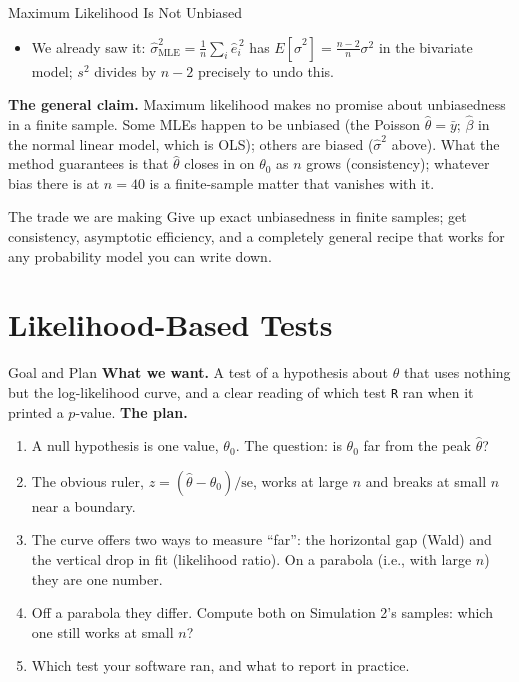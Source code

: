 \documentclass[aspectratio=169,11pt,xcolor=dvipsnames]{beamer}
\newcommand{\E}{E}
\newcommand{\SE}{\mathrm{se}}
\newcommand{\core}{\,\raisebox{0.6pt}{\textcolor{corestar}{$\bigstar$}}}
\begin{document}
\begin{frame}{Maximum Likelihood Is Not Unbiased\core}
\begin{itemize}\itemsep4pt
  \item We already saw it: $\hat\sigma^2_{\text{MLE}} = \frac1n\sum_i \hat e_i^{\,2}$
        has $\E[\hat\sigma^2] = \frac{n-2}{n}\sigma^2$ in the bivariate
        model; $s^2$ divides by $n-2$ precisely to undo this.
\end{itemize}
\vskip6pt
\textbf{The general claim.} Maximum likelihood makes no promise about
unbiasedness in a finite sample. Some MLEs happen to be unbiased (the Poisson
$\hat\theta = \bar y$; $\hat\beta$ in the normal linear model, which is OLS);
others are biased ($\hat\sigma^2$ above). What the method guarantees is that
$\hat\theta$ closes in on $\theta_0$ as $n$ grows (consistency); whatever
bias there is at $n = 40$ is a finite-sample matter that vanishes with it.
\vskip8pt
\begin{alertblock}{The trade we are making}
Give up exact unbiasedness in finite samples; get consistency, asymptotic
efficiency, and a completely general recipe that works for any probability model
you can write down.
\end{alertblock}
\end{frame}

\section[Testing]{Likelihood-Based Tests}


\begin{frame}\sectionpage\end{frame}

\begin{frame}{Goal and Plan}
\textbf{What we want.} A test of a hypothesis about $\theta$ that uses
nothing but the log-likelihood curve, and a clear reading of which test
\texttt{R} ran when it printed a $p$-value.
\vskip4pt
\textbf{The plan.}
\begin{enumerate}\itemsep3pt
  \item A null hypothesis is one value, $\theta_0$. The question: is
        $\theta_0$ far from the peak $\hat\theta$?
  \item The obvious ruler, $z = (\hat\theta - \theta_0)/\SE$, works at large
        $n$ and breaks at small $n$ near a boundary.
  \item The curve offers two ways to measure ``far'': the horizontal gap
        (Wald) and the vertical drop in fit (likelihood ratio). On a
        parabola (i.e., with large $n$) they are one number.
  \item Off a parabola they differ. Compute both on Simulation 2's
        samples: which one still works at small $n$?
  \item Which test your software ran, and what to report in practice.
\end{enumerate}
\end{frame}
\end{document}
